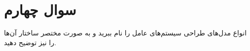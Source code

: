 \section{سوال چهارم}


انواع مدل‌های طراحی سیستم‌های عامل را نام ببرید و به صورت مختصر ساختار آن‌ها را نیز توضیح دهید.

\begin{qsolve}
	
\end{qsolve}